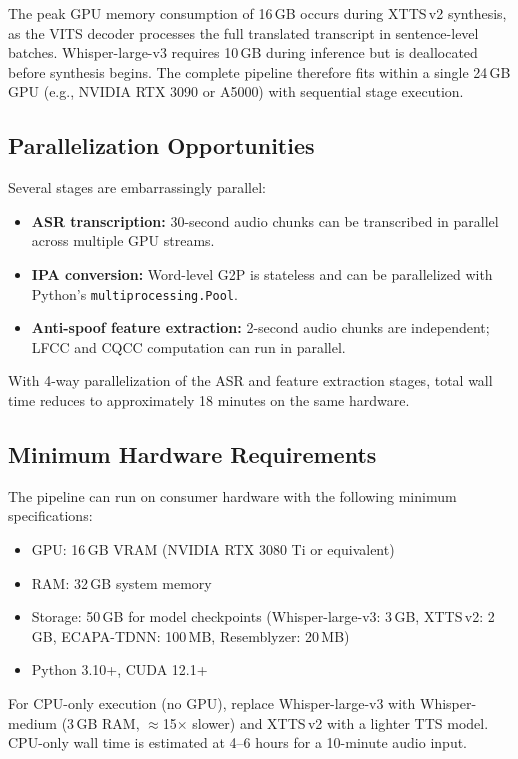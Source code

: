 \documentclass[11pt]{article}
\begin{document}
The peak GPU memory consumption of 16\,GB occurs during XTTS\,v2 synthesis,
as the VITS decoder processes the full translated transcript in sentence-level
batches. Whisper-large-v3 requires 10\,GB during inference but is deallocated
before synthesis begins. The complete pipeline therefore fits within a single
24\,GB GPU (e.g., NVIDIA RTX 3090 or A5000) with sequential stage execution.

\subsection{Parallelization Opportunities}

Several stages are embarrassingly parallel:
\begin{itemize}
  \item \textbf{ASR transcription:} 30-second audio chunks can be transcribed
        in parallel across multiple GPU streams.
  \item \textbf{IPA conversion:} Word-level G2P is stateless and can be
        parallelized with Python's \texttt{multiprocessing.Pool}.
  \item \textbf{Anti-spoof feature extraction:} 2-second audio chunks are
        independent; LFCC and CQCC computation can run in parallel.
\end{itemize}

With 4-way parallelization of the ASR and feature extraction stages, total
wall time reduces to approximately 18 minutes on the same hardware.

\subsection{Minimum Hardware Requirements}

The pipeline can run on consumer hardware with the following minimum specifications:
\begin{itemize}
  \item GPU: 16\,GB VRAM (NVIDIA RTX 3080 Ti or equivalent)
  \item RAM: 32\,GB system memory
  \item Storage: 50\,GB for model checkpoints (Whisper-large-v3: 3\,GB,
        XTTS\,v2: 2\,GB, ECAPA-TDNN: 100\,MB, Resemblyzer: 20\,MB)
  \item Python 3.10+, CUDA 12.1+
\end{itemize}

For CPU-only execution (no GPU), replace Whisper-large-v3 with
Whisper-medium (3\,GB RAM, $\approx$15$\times$ slower) and XTTS\,v2 with
a lighter TTS model. CPU-only wall time is estimated at 4--6 hours for a
10-minute audio input.
\end{document}
